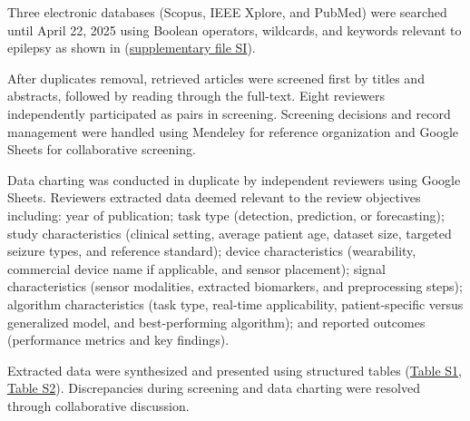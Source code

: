 Three electronic databases (Scopus, IEEE Xplore, and PubMed) were searched until April 22, 2025  using Boolean operators, wildcards, and keywords relevant to epilepsy as shown in (\href{https://docs.google.com/document/d/1FJTEZIhRoBhq3tmehHFUZllaM-GqR_4c1j9waukcQow/edit?tab=t.0}{supplementary file SI}). 

After duplicates removal, retrieved articles were screened first by titles and abstracts, followed by reading through the full-text. Eight reviewers independently participated as pairs in screening. Screening decisions and record management were handled using Mendeley for reference organization and Google Sheets for collaborative screening. 

Data charting was conducted in duplicate by independent reviewers using Google Sheets. Reviewers extracted data deemed relevant to the review objectives including: year of publication; task type (detection, prediction, or forecasting); study characteristics (clinical setting,  average patient age, dataset size, targeted seizure types, and reference standard); device characteristics (wearability, commercial device name if applicable, and sensor placement); signal characteristics (sensor modalities, extracted biomarkers, and preprocessing steps); algorithm characteristics (task type, real-time applicability, patient-specific versus generalized model, and best-performing algorithm); and reported outcomes (performance metrics and key findings). 

Extracted data were synthesized and presented using structured tables (\href{https://docs.google.com/spreadsheets/d/1FjxwkHFbNDM84nuqg513gR_0vIVql-evoT1EMiqSYZU/edit?pli=1&gid=1255223968#gid=1255223968}{Table S1}, \href{https://docs.google.com/spreadsheets/d/1FjxwkHFbNDM84nuqg513gR_0vIVql-evoT1EMiqSYZU/edit?pli=1&gid=97270185#gid=97270185}{Table S2}).
Discrepancies during screening and data charting were resolved through collaborative discussion.
